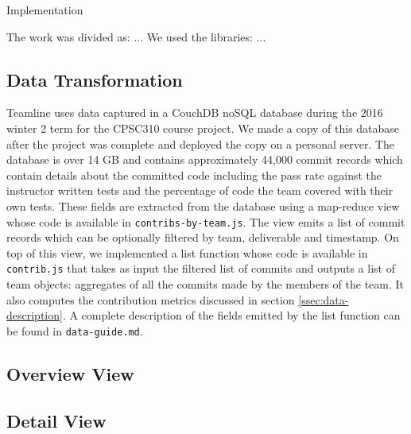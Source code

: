 \documentclass[../manifest.tex]{subfiles}
\begin{document}
Implementation

The work was divided as: ...
We used the libraries: ...

\subsection{Data Transformation}
Teamline uses data captured in a CouchDB noSQL database during the 2016 winter 2 term for the CPSC310 course project. We made a copy of this database after the project was complete and deployed the copy on a personal server. The database is over 14 GB and contains approximately 44,000 commit records which contain details about the committed code including the pass rate against the instructor written tests and the percentage of code the team covered with their own tests. These fields are extracted from the database using a map-reduce view whose code is available in \texttt{contribs-by-team.js}. The view emits a list of commit records which can be optionally filtered by team, deliverable and timestamp. On top of this view, we implemented a list function whose code is available in \texttt{contrib.js} that takes as input the filtered list of commits and outputs a list of team objects: aggregates of all the commits made by the members of the team. It also computes the contribution metrics discussed in section \ref{ssec:data-description}. A complete description of the fields emitted by the list function can be found in \texttt{data-guide.md}.

\subsection{Overview View}
\subsection{Detail View}
\end{document}
